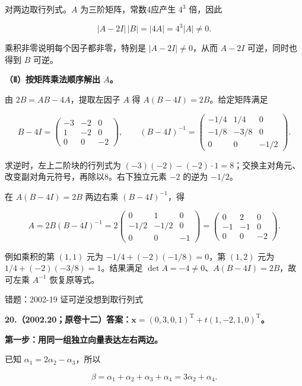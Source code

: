 \documentclass[UTF8,11pt,fontset=windows]{ctexart}
\begin{document}
对两边取行列式。$A$ 为三阶矩阵，常数4应产生 $4^3$ 倍，因此

$$
|A-2I|\,|B|=|4A|=4^3|A|\ne0.
$$

乘积非零说明每个因子都非零，特别是 $|A-2I|\ne0$，从而 $A-2I$ 可逆，同时也得到 $B$ 可逆。

\textbf{（Ⅱ）按矩阵乘法顺序解出 $A$。}

由 $2B=AB-4A$，提取左因子 $A$ 得 $A(B-4I)=2B$。给定矩阵满足

$$
B-4I=\begin{pmatrix}-3&-2&0\\1&-2&0\\0&0&-2\end{pmatrix},
\qquad
(B-4I)^{-1}=\begin{pmatrix}-1/4&1/4&0\\-1/8&-3/8&0\\0&0&-1/2\end{pmatrix}.
$$

求逆时，左上二阶块的行列式为 $(-3)(-2)-(-2)\cdot1=8$；交换主对角元、改变副对角元符号，再除以8。右下独立元素 $-2$ 的逆为 $-1/2$。

在 $A(B-4I)=2B$ 两边右乘 $(B-4I)^{-1}$，得

$$
A=2B(B-4I)^{-1}
=2\begin{pmatrix}0&1&0\\-1/2&-1/2&0\\0&0&-1\end{pmatrix}
=\boxed{\begin{pmatrix}0&2&0\\-1&-1&0\\0&0&-2\end{pmatrix}}.
$$

例如乘积的第 $(1,1)$ 元为 $-1/4+(-2)(-1/8)=0$，第 $(1,2)$ 元为 $1/4+(-2)(-3/8)=1$。结果满足 $\det A=-4\ne0$、$A(B-4I)=2B$，故可左乘 $A^{-1}$ 恢复原等式。

\begingroup\color{gray}错题：2002-19 证可逆没想到取行列式\par\endgroup

\clearpage

\textbf{20.（2002.20；原卷十二）答案：$\boldsymbol x=(0,3,0,1)^{\mathrm T}+t(1,-2,1,0)^{\mathrm T}$。}

\textbf{第一步：用同一组独立向量表达左右两边。}

已知 $\alpha_1=2\alpha_2-\alpha_3$，所以

$$
\beta=\alpha_1+\alpha_2+\alpha_3+\alpha_4
=3\alpha_2+\alpha_4.
$$
\end{document}
